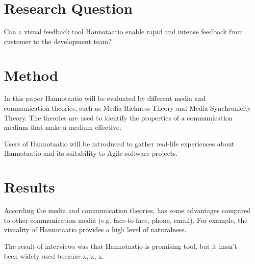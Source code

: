 \documentclass[a4paper]{article}
\begin{document}
\section{Research Question}

Can a visual feedback tool Hannotaatio enable rapid and intense feedback from customer to the development team?

\begin{comment}
Based on what other people have studied before, what is the question that no one has really answered yet? What is the main question, and what are perhaps the two or three sub-questions that you need to answer to be able to answer the main question? Be sure of what you write, because you will have to answer to this question ☺
\end{comment}

\section{Method}
In this paper Hannotaatio will be evaluated by different media and communication theories, such as Media Richness Theory and Media Synchronicity Theory. The theories are used to identify the properties of a communication medium that make a medium effective. 

Users of Hannotaatio will be introduced to gather real-life experiences about Hannotaatio and its suitability to Agile software projects.

\begin{comment}
How do you find an answer to the research question? How do you gather data? From where do you gather data? How do you analyze the data? Out of all the methods in the world, why did you choose this one? What is good about it and what is not? What were the alternative methods, and what were their pros and cons? 
\end{comment}

\section{Results}
According the media and communication theories, has some advantages compared to other communication media (e.g. face-to-face, phone, email). For example, the visuality of Hannotaatio provides a high level of naturalness.

The result of interviews was that Hannotaatio is promising tool, but it hasn't been widely used because x, x, x.

\begin{comment}
What is the answer to the research question? What are the answers to the sub-questions? Keep this simple and clear.
\end{comment}
\end{document}
